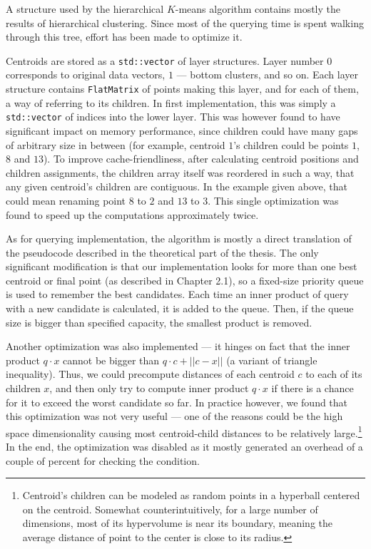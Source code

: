 A structure used by the hierarchical $K$-means algorithm contains mostly the results of 
hierarchical clustering.
Since most of the querying time is spent walking through this tree, effort has been made
to optimize it.

Centroids are stored as a \texttt{std::vector} of layer structures. Layer number $0$ corresponds
to original data vectors, $1$ --- bottom clusters, and so on. Each layer structure contains
\texttt{FlatMatrix} of points making this layer, and for each of them, a way of referring to
its children. In first implementation, this was simply a \texttt{std::vector} of indices into
the lower layer. This was however found to have significant impact on memory performance,
since children could have many gaps of arbitrary size in between (for example, centroid
$1$'s children could be points $1$, $8$ and $13$). To improve cache-friendliness, after
calculating centroid positions and children assignments, the children array itself was 
reordered in such a way, that any given centroid's children are contiguous. In the example
given above, that could mean renaming point $8$ to $2$ and $13$ to $3$. This single
optimization was found to speed up the computations approximately twice.

As for querying implementation, the algorithm is mostly a direct translation of the pseudocode
described in the theoretical part of the thesis. The only significant modification is 
that our implementation looks for more than one best centroid or final point
(as described in Chapter 2.1), so a
fixed-size priority queue is used to remember the best candidates. Each time an inner
product of query with a new candidate is calculated, it is added to the queue.
Then, if the queue size is bigger than specified capacity, the smallest product is
removed.

Another optimization was also implemented --- it hinges on fact that the inner product
$q \cdot x$ cannot be bigger than $q \cdot c + ||c - x||$ (a variant of triangle inequality).
Thus, we could precompute distances of each centroid $c$ to each of its children $x$,
and then only try to compute inner product $q \cdot x$ if there is a chance for 
it to exceed the worst candidate so far. In practice however, we found that this
optimization was not very useful --- one of the reasons could be the high space
dimensionality causing most centroid-child distances to be relatively large.\footnote{
Centroid's children can be modeled as random points in a hyperball centered on the
centroid. Somewhat counterintuitively, for a large number of dimensions, 
most of its hypervolume is near its boundary, meaning the average distance of point
to the center is close to its radius.
} In the end, the optimization was disabled as it mostly generated an overhead of a
couple of percent for checking the condition.
